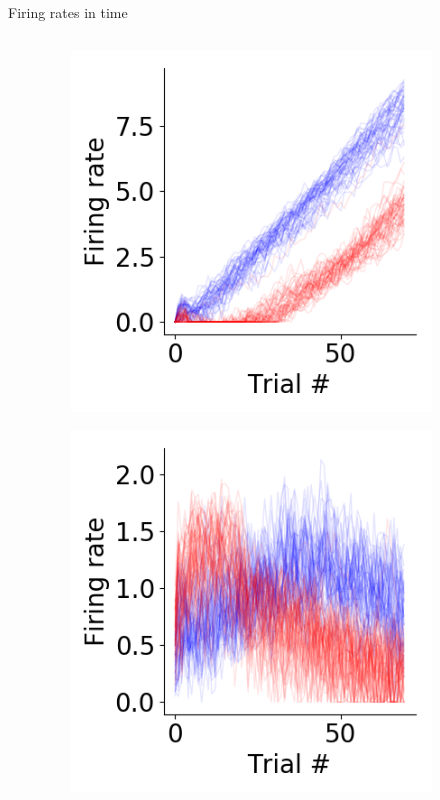 \documentclass[14pt]{beamer}
\begin{document}
\begin{frame}{Firing rates in time}
\begin{columns}
\begin{column}{0.3\textwidth}
\end{column}

\begin{column}{0.3\textwidth}

  \begin{figure}
  \includegraphics[width=0.9\textwidth]{images/ptask/timecourse-33}
  \end{figure}
  \vspace{-1cm}
  \begin{figure}
    \includegraphics[width=0.9\textwidth]{images/ptask/timecourse-34}
  \end{figure}

\end{column}

\end{columns}

\end{frame}
\end{document}
